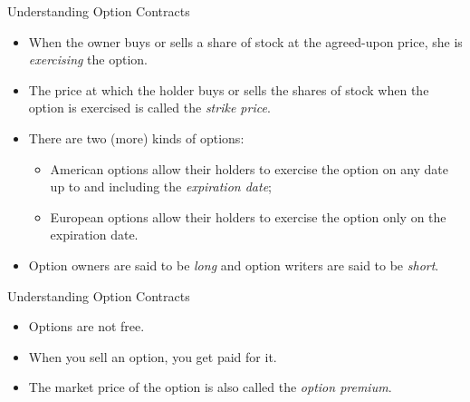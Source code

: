 \documentclass{beamer}
\begin{document}
\begin{frame}{Understanding Option Contracts}
\begin{itemize}
\item When the owner buys or sells a share of stock at the agreed-upon price, she is \textit{exercising} the option. 
\item The price at which the holder buys or sells the shares of stock when the option is exercised is called the \textit{strike price}. 
\item There are two (more) kinds of options:
\begin{itemize}
\item American options allow their holders to exercise the option on any date up to and including the \textit{expiration date};
\item European options allow their holders to exercise the option only on the expiration date. 
\end{itemize}
\item Option owners are said to be \textit{long} and option writers are said to be \textit{short}. 
\end{itemize}
\end{frame}

\begin{frame}{Understanding Option Contracts}
\begin{itemize}
\item Options are not free. 
\item When you sell an option, you get paid for it. 
\item The market price of the option is also called the \textit{option premium}. 
\end{itemize}
\end{frame}
\end{document}
